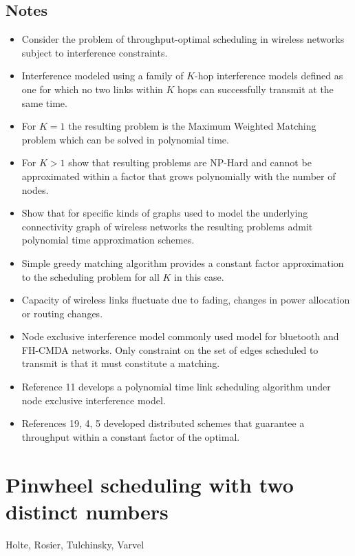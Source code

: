 \documentclass{article}
\begin{document}
\subsection{Notes}
\begin{itemize}
    \item Consider the problem of throughput-optimal scheduling in wireless networks subject to interference constraints.
    \item Interference modeled using a family of $K$-hop interference models defined as one for which no two links within $K$ hops can successfully transmit at the same time.
    \item For $K=1$ the resulting problem is the Maximum Weighted Matching problem which can be solved in polynomial time.
    \item For $K > 1$ show that resulting problems are NP-Hard and cannot be approximated within a factor that grows polynomially with the number of nodes.
    \item Show that for specific kinds of graphs used to model the underlying connectivity graph of wireless networks the resulting problems admit polynomial time approximation schemes.
    \item Simple greedy matching algorithm provides a constant factor approximation to the scheduling problem for all $K$ in this case.
    \item Capacity of wireless links fluctuate due to fading, changes in power allocation or routing changes.
    \item Node exclusive interference model commonly used model for bluetooth and FH-CMDA networks.  Only constraint on the set of edges scheduled to transmit is that it must constitute a matching.
    \item Reference 11 develops a polynomial time link scheduling algorithm under node exclusive interference model.
    \item References 19, 4, 5 developed distributed schemes that guarantee a throughput within a constant factor of the optimal.
\end{itemize}

\section{Pinwheel scheduling with two distinct numbers}
Holte, Rosier, Tulchinsky, Varvel
\end{document}
